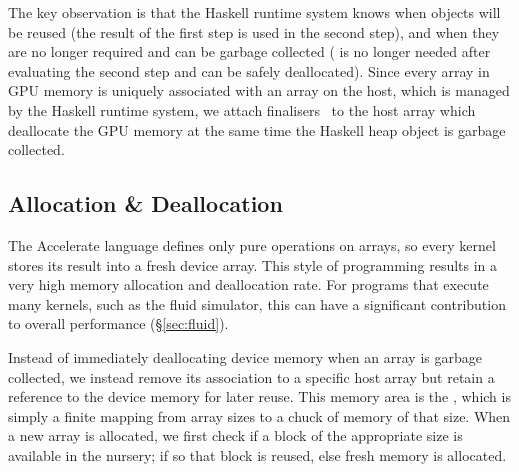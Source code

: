 The key observation is that the Haskell runtime system knows when objects will
be reused (the result of the first step  is used in the second step),
and when they are no longer required and can be garbage collected ( is
no longer needed after evaluating the second step and can be safely
deallocated). Since every array in GPU memory is uniquely associated with an
array on the host, which is managed by the Haskell runtime system, we attach
finalisers~\cite{PeytonJones:2000ks} to the host array which deallocate the GPU
memory at the same time the Haskell heap object is garbage collected.

% 


\subsection{Allocation \& Deallocation}

The Accelerate language defines only pure operations on arrays, so every kernel
stores its result into a fresh device array. This style of programming results
in a very high memory allocation and deallocation rate. For programs that
execute many kernels, such as the fluid simulator, this can have a
significant contribution to overall performance (\S\ref{sec:fluid}).

Instead of immediately deallocating device memory when an array is garbage
collected, we instead remove its association to a specific host array but retain
a reference to the device memory for later reuse. This memory area is the
, which is simply a finite mapping from array sizes to a chuck
of memory of that size. When a new array is allocated, we first check if a block
of the appropriate size is available in the nursery; if so that block is reused,
else fresh memory is allocated.

% 

